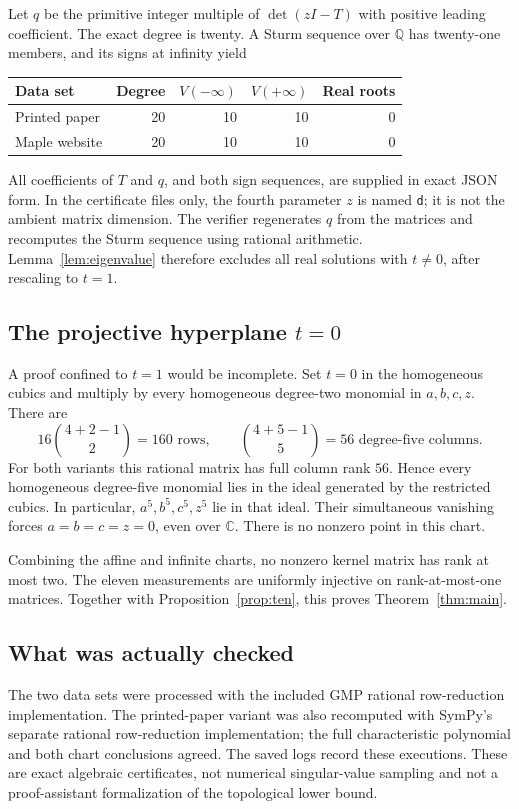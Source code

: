\documentclass[11pt]{article}
\theoremstyle{definition}
\newcommand{\C}{\mathbb C}
\newcommand{\Q}{\mathbb Q}
\begin{document}
Let $q$ be the primitive integer multiple of $\det(zI-T)$ with positive leading coefficient. The exact degree is twenty. A Sturm sequence over $\Q$ has twenty-one members, and its signs at infinity yield
\begin{center}
\begin{tabular}{lrrrr}
\toprule
Data set & Degree & $V(-\infty)$ & $V(+\infty)$ & Real roots\\
\midrule
Printed paper & 20 & 10 & 10 & 0\\
Maple website & 20 & 10 & 10 & 0\\
\bottomrule
\end{tabular}
\end{center}
All coefficients of $T$ and $q$, and both sign sequences, are supplied in exact JSON form. In the certificate files only, the fourth parameter $z$ is named \texttt{d}; it is not the ambient matrix dimension. The verifier regenerates $q$ from the matrices and recomputes the Sturm sequence using rational arithmetic. Lemma~\ref{lem:eigenvalue} therefore excludes all real solutions with $t\neq0$, after rescaling to $t=1$.

\subsection{The projective hyperplane \texorpdfstring{$t=0$}{t = 0}}
A proof confined to $t=1$ would be incomplete. Set $t=0$ in the homogeneous cubics and multiply by every homogeneous degree-two monomial in $a,b,c,z$. There are
\[
 16\binom{4+2-1}{2}=160\text{ rows},\qquad
 \binom{4+5-1}{5}=56\text{ degree-five columns}.
\]
For both variants this rational matrix has full column rank $56$. Hence every homogeneous degree-five monomial lies in the ideal generated by the restricted cubics. In particular, $a^5,b^5,c^5,z^5$ lie in that ideal. Their simultaneous vanishing forces $a=b=c=z=0$, even over $\C$. There is no nonzero point in this chart.

Combining the affine and infinite charts, no nonzero kernel matrix has rank at most two. The eleven measurements are uniformly injective on rank-at-most-one matrices. Together with Proposition~\ref{prop:ten}, this proves Theorem~\ref{thm:main}.

\subsection{What was actually checked}
The two data sets were processed with the included GMP rational row-reduction implementation. The printed-paper variant was also recomputed with SymPy's separate rational row-reduction implementation; the full characteristic polynomial and both chart conclusions agreed. The saved logs record these executions. These are exact algebraic certificates, not numerical singular-value sampling and not a proof-assistant formalization of the topological lower bound.
\end{document}
